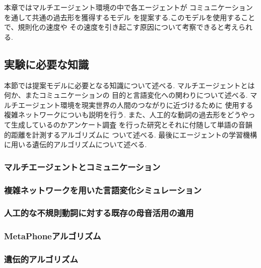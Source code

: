 本章ではマルチエージェント環境の中で各エージェントが
コミュニケーションを通して共通の過去形を獲得するモデル
を提案する.このモデルを使用することで、規則化の速度や
その速度を引き起こす原因について考察できると考えられる.


\subsection{実験に必要な知識}
本節では提案モデルに必要となる知識について述べる.
マルチエージェントとは何か、またコミュニケーションの
目的と言語変化への関わりについて述べる.
マルチエージェント環境を現実世界の人間のつながりに近づけるために
使用する複雑ネットワークについも説明を行う.
また、人工的な動詞の過去形をどうやって生成しているのかアンケート調査
を行った研究とそれに付随して単語の音韻的距離を計測するアルゴリズムに
ついて述べる.
最後にエージェントの学習機構に用いる遺伝的アルゴリズムについて述べる.

\subsubsection{マルチエージェントとコミュニケーション}
\subsubsection{複雑ネットワークを用いた言語変化シミュレーション}
\subsubsection{人工的な不規則動詞に対する既存の母音活用の適用}
\subsubsection{MetaPhoneアルゴリズム}
\subsubsection{遺伝的アルゴリズム}

